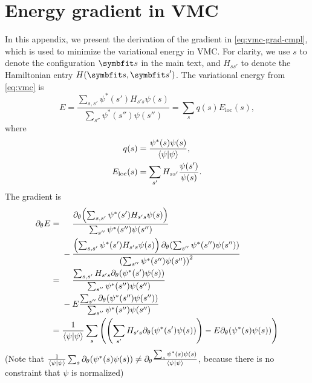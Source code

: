 \appendix

\newcommand{\dta}{{\Delta \tau}}
\newcommand{\dth}{{\Delta \theta}}
\newcommand{\evbig}[1]{\big\langle #1 \big\rangle}
\newcommand{\fpsps}[1]{\frac{#1}{\ip{\psi}}}
\newcommand{\pp}{\partial}

\chapter{Energy gradient in VMC}
\label{append:vmc-grad}

In this appendix, we present the derivation of the gradient in \cref{eq:vmc-grad-cmpl}, which is used to minimize the variational energy in VMC. For clarity, we use $s$ to denote the configuration $\vs$ in the main text, and $H_{s s'}$ to denote the Hamiltonian entry $H(\vs, \vs')$. The variational energy from \cref{eq:vmc} is
\begin{equation}
E = \frac{\sum_{s, s'} \psi^*(s') H_{s' s} \psi(s)}{\sum_{s''} \psi^*(s'') \psi(s'')}
= \sum_s q(s) E_\text{loc}(s),
\end{equation}
where
\begin{align}
q(s) &= \frac{\psi^*(s) \psi(s)}{\ip{\psi}}, \\
E_\text{loc}(s) &= \sum_{s'} H_{s s'} \frac{\psi(s')}{\psi(s)}.
\end{align}
The gradient is
\begin{align}
\pp_\theta E &= \phantom{{}-{}}\frac{\pp_\theta\!\left( \sum_{s, s'} \psi^*(s') H_{s' s} \psi(s) \right)}{\sum_{s''} \psi^*(s'') \psi(s'')} \nonumber \\
&\phantom{{}={}}- \frac{\left( \sum_{s, s'} \psi^*(s') H_{s' s} \psi(s) \right) \pp_\theta\!\left( \sum_{s''} \psi^*(s'') \psi(s'') \right)}{\left( \sum_{s''} \psi^*(s'') \psi(s'') \right)^2} \\
&= \phantom{{}-{}}\frac{\sum_{s, s'} H_{s' s} \pp_\theta\!\left( \psi^*(s') \psi(s) \right)}{\sum_{s''} \psi^*(s'') \psi(s'')} \nonumber \\
&\phantom{{}={}}- E \frac{\sum_{s''} \pp_\theta\!\left( \psi^*(s'') \psi(s'') \right)}{\sum_{s''} \psi^*(s'') \psi(s'')} \\
&= \frac{1}{\ip{\psi}} \sum_s \left( \left( \sum_{s'} H_{s' s} \pp_\theta\!\left( \psi^*(s') \psi(s) \right) \right) - E \pp_\theta\!\left( \psi^*(s) \psi(s) \right) \right)
\end{align}
(Note that $\frac{1}{\ip{\psi}} \sum_s \pp_\theta\!\left( \psi^*(s) \psi(s) \right) \neq \pp_\theta \frac{\sum_s \psi^*(s) \psi(s)}{\ip{\psi}}$, because there is no constraint that $\psi$ is normalized)

